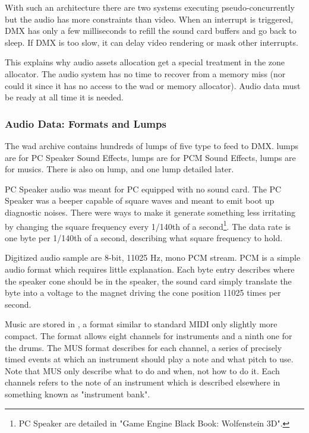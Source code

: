 With such an architecture there are two systems executing pseudo-concurrently but the audio has more constraints than video. When an interrupt is triggered, DMX has only a few milliseconds to refill the sound card buffers and go back to sleep. If DMX is too slow, it can delay video rendering or mask other interrupts.\\
\par
 This explains why audio assets allocation get a special treatment in the zone allocator. The audio system has no time to recover from a memory miss (nor could it since it has no access to the wad or memory allocator). Audio data must be ready at all time it is needed.

\subsubsection{Audio Data: Formats and Lumps}
The wad archive contains hundreds of lumps of five type to feed to DMX.  lumps are for PC Speaker Sound Effects,  lumps are for PCM Sound Effects,  lumps are for musics. There is also on  lump, and one  lump detailed later.\\
\par
PC Speaker audio was meant for PC equipped with no sound card. The PC Speaker was a beeper capable of square waves and meant to emit boot up diagnostic noises. There were ways to make it generate something less irritating by changing the square frequency every 1/140th of a second\footnote{PC Speaker are detailed in "Game Engine Black Book: Wolfenstein 3D".}. The data rate is one byte per 1/140th of a second, describing what square frequency to hold.\\
\par
 Digitized audio sample are 8-bit, 11025 Hz, mono PCM stream. PCM is a simple audio format which requires little explanation. Each byte entry describes where the speaker cone should be in the speaker, the sound card simply translate the byte into a voltage to the magnet driving the cone position 11025 times per second.\\
\par
Music are stored in , a format similar to standard MIDI only slightly more compact. The format allows eight channels for instruments and a ninth one for the drums. The MUS format describes for each channel, a series of precisely timed events at which an instrument should play a note and what pitch to use. Note that MUS only describe what to do and when, not how to do it. Each channels refers to the note of an instrument which is described elsewhere in something known as "instrument bank".\\
